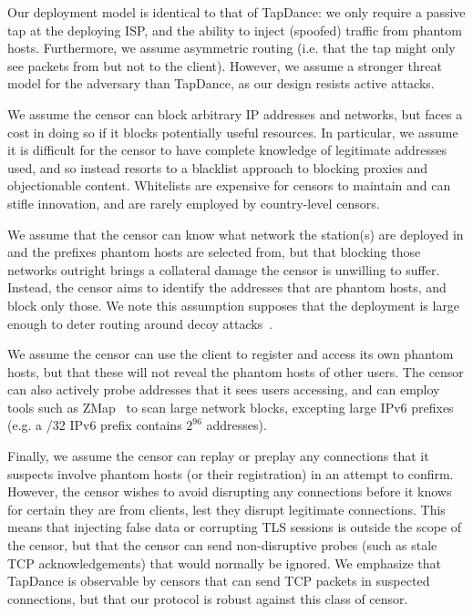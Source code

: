 \documentclass[sigconf]{acmart}
\begin{document}
Our deployment model is identical to that of TapDance: we only require a passive
tap at the deploying ISP, and the ability to inject (spoofed) traffic from phantom
hosts.
Furthermore, we assume
asymmetric routing (i.e. that the tap might only see packets from but not to the
client).
However, we assume a stronger threat model for the adversary than
TapDance, as our design resists active attacks.


We assume the censor can block arbitrary IP addresses and networks, but faces a
cost in doing so if it blocks potentially useful resources. In particular, we
assume it is difficult for the censor to have complete knowledge of legitimate
addresses used, and so instead resorts to a blacklist approach to blocking
proxies and objectionable content.
Whitelists are expensive for censors to maintain and can stifle
innovation, and are rarely employed by country-level censors.


We assume that the censor can know what network the \scheme station(s) are
deployed in and the prefixes phantom hosts are selected from, but that blocking those
networks outright brings a collateral
damage the censor is unwilling to suffer. Instead, the censor aims to identify
the addresses that are phantom hosts, and block only those. We note this
assumption supposes that the deployment is large enough to deter routing around
decoy attacks~\cite{rad12,true-cost-rad}.

We assume the censor can use the client to register and access its own phantom
hosts, but that these will not reveal the phantom hosts of other users. The
censor can also actively probe addresses that it sees users accessing, and can
employ tools such as ZMap~\cite{zmap13} to scan large network blocks, excepting
large IPv6 prefixes (e.g. a /32 IPv6 prefix contains $2^{96}$ addresses).

Finally, we assume the censor can replay or preplay any connections that it
suspects involve phantom hosts (or their registration) in an attempt to confirm.
However, the censor wishes to avoid disrupting any connections before it
knows for certain they are from \scheme clients, lest they disrupt legitimate
connections. This means that injecting false data or corrupting TLS sessions is
outside the scope of the censor, but that the censor can send non-disruptive
probes (such as stale TCP acknowledgements) that would normally
be ignored. We emphasize that TapDance is observable by censors that can send
TCP packets in suspected connections, but that our protocol is robust against
this class of censor.
\end{document}
